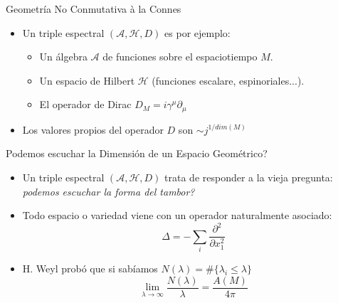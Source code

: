 \documentclass{beamer}
\begin{document}
\begin{frame}{Geometría No Conmutativa à la Connes}

\begin{itemize}
\item Un triple espectral $(\mathcal{A}, \mathcal{H}, D)$ es por ejemplo:
\vspace{4mm}
 \begin{itemize}
 \item Un álgebra $\mathcal{A}$ de funciones sobre el espaciotiempo $M$.
 \item Un espacio de Hilbert $\mathcal{H}$ (funciones escalare, espinoriales...).
 \item El operador de Dirac $D_M = i \gamma^\mu \partial_\mu$
 \end{itemize} 
\vspace{6mm}
\item Los valores propios del operador $D$ son $\sim j^{1/dim(M)}$
 

\end{itemize}
\end{frame}




\begin{frame}{Podemos escuchar la Dimensión de un Espacio Geométrico?}

\begin{itemize}
\item Un triple espectral $(\mathcal{A}, \mathcal{H}, D)$ trata de responder a la vieja pregunta: \textit{podemos escuchar la forma del tambor?}
\vspace{5mm}
\item Todo espacio o variedad viene con un operador naturalmente asociado:
\[ \Delta = - \sum_{i} \frac{\partial^2}{\partial x_{1}^{2}}
\]
\vspace{2mm}
 \item H. Weyl probó que si sabíamos $N(\lambda) = \# \{ \lambda_i \leq \lambda \}$
 \[ \lim_{\lambda \to \infty} \frac{N(\lambda)}{\lambda} = \frac{A(M)}{4 \pi}
\]

\end{itemize}
\end{frame}
\end{document}

